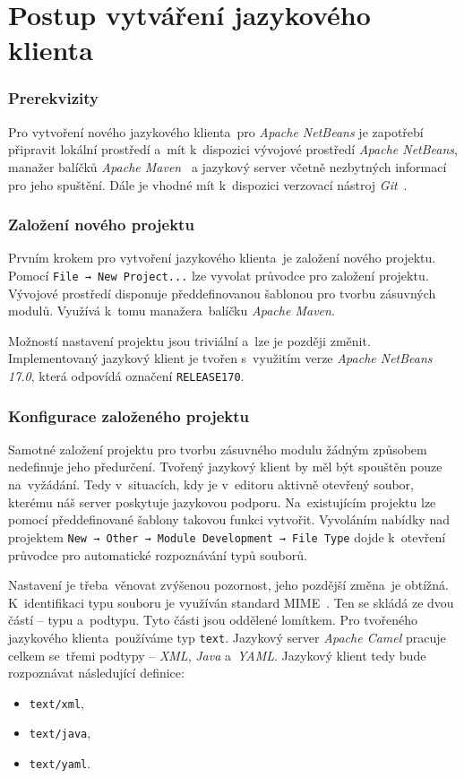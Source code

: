 \section{Postup vytváření jazykového klienta}

\subsubsection{Prerekvizity}
\label{implementaceKlienta-prerekvizity}
Pro vytvoření nového jazykového klienta~pro \emph{Apache NetBeans} je zapotřebí připravit lokální prostředí a~mít k~dispozici vývojové prostředí \emph{Apache NetBeans}, manažer balíčků \emph{Apache Maven}~\cite{maven} a jazykový server včetně nezbytných informací pro jeho spuštění. Dále je vhodné mít k~dispozici verzovací nástroj \emph{Git}~\cite{gitcite}.

\subsubsection{Založení nového projektu}
Prvním krokem pro vytvoření jazykového klienta~je založení nového projektu. Pomocí \texttt{File → New Project...} lze vyvolat průvodce pro založení projektu. Vývojové prostředí disponuje předdefinovanou šablonou pro tvorbu zásuvných modulů. Využívá k~tomu manažera~balíčku \emph{Apache Maven}.

Možností nastavení projektu jsou triviální a~lze je později změnit. Implementovaný jazykový klient je tvořen s~využitím verze \emph{Apache NetBeans 17.0}, která odpovídá označení \texttt{RELEASE170}.

\subsubsection{Konfigurace založeného projektu}
Samotné založení projektu pro tvorbu zásuvného modulu žádným způsobem nedefinuje jeho předurčení. Tvořený jazykový klient by měl být spouštěn pouze na~vyžádání. Tedy v~situacích, kdy je v~editoru aktivně otevřený soubor, kterému náš server poskytuje jazykovou podporu. Na~existujícím projektu lze pomocí předdefinované šablony takovou funkci vytvořit. Vyvoláním nabídky nad projektem \texttt{New → Other → Module Development → File Type} dojde k~otevření průvodce pro automatické rozpoznávání typů souborů.

Nastavení je třeba~věnovat zvýšenou pozornost, jeho pozdější změna~je obtížná. K~identifikaci typu souboru je využíván standard MIME~\cite{MozillaMIME}. Ten se skládá ze dvou částí -- typu a~podtypu. Tyto části jsou oddělené lomítkem. Pro tvořeného jazykového klienta~používáme typ \texttt{text}. Jazykový server \emph{Apache Camel} pracuje celkem se~třemi podtypy -- \emph{XML}, \emph{Java} a~\emph{YAML}. Jazykový klient tedy bude rozpoznávat následující definice: 
\begin{itemize}
    \item \texttt{text/xml},
    \item \texttt{text/java},
    \item \texttt{text/yaml}.
\end{itemize} 

